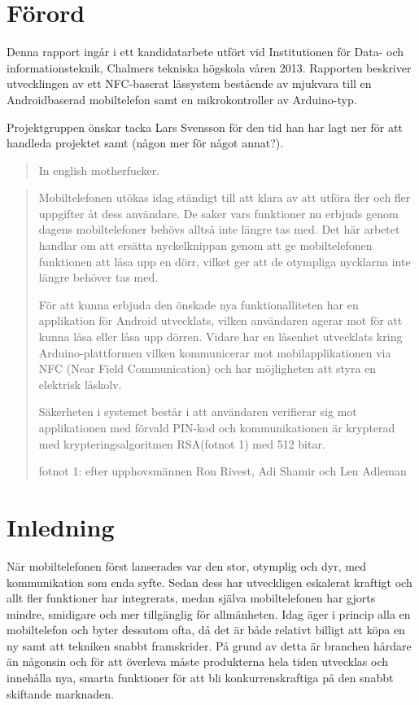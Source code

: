 \documentclass[11pt]{article}
\begin{document}
\section*{Förord}
Denna rapport ingår i ett kandidatarbete utfört vid Institutionen för Data- och informationsteknik, Chalmers tekniska högskola våren 2013. Rapporten beskriver utvecklingen av ett NFC-baserat låssystem bestående av mjukvara till en Androidbaserad mobiltelefon samt en mikrokontroller av Arduino-typ. 

Projektgruppen önskar tacka Lars Svensson för den tid han har lagt ner för att handleda projektet samt (någon mer för något annat?).

\newpage

\renewcommand{\abstractname}{Abstract}
\begin{abstract}
In english motherfucker.
\end{abstract}
\newpage
\renewcommand{\abstractname}{Sammanfattning}
\begin{abstract}
Mobiltelefonen utökas idag ständigt till att klara av att utföra fler och fler uppgifter åt dess användare. De saker vars funktioner nu erbjuds genom dagens mobiltelefoner behövs alltså inte längre tas med. Det här arbetet handlar om att ersätta nyckelknippan genom att ge mobiltelefonen funktionen att låsa upp en dörr, vilket ger att de otympliga nycklarna inte längre behöver tas med.

För att kunna erbjuda den önskade nya funktionalliteten har en applikation för Android utvecklats, vilken användaren agerar mot för att kunna låsa eller låsa upp dörren. Vidare har en låsenhet utvecklats kring Arduino-plattformen vilken kommunicerar mot mobilapplikationen via NFC (Near Field Communication) och har möjligheten att styra en elektrisk låskolv.

Säkerheten i systemet består i att användaren verifierar sig mot applikationen med förvald PIN-kod och kommunikationen är krypterad med krypteringsalgoritmen RSA(fotnot 1) med 512 bitar.

fotnot 1: efter upphovsmännen Ron Rivest, Adi Shamir och Len Adleman
\end{abstract}
\newpage


\setcounter{tocdepth}{4}
\tableofcontents
\newpage



\section{Inledning}
När mobiltelefonen först lanserades var den stor, otymplig och dyr, med kommunikation som enda syfte. Sedan dess har utveckligen eskalerat kraftigt och allt fler funktioner har integrerats, medan själva mobiltelefonen har gjorts mindre, smidigare och mer tillgänglig för allmänheten. Idag äger i princip alla en mobiltelefon och byter dessutom ofta, då det är både relativt billigt att köpa en ny samt att tekniken snabbt framskrider. På grund av detta är branchen hårdare än någonsin och för att överleva måste produkterna hela tiden utvecklas och innehålla nya, smarta funktioner för att bli konkurrenskraftiga på den snabbt skiftande marknaden.
\end{document}
